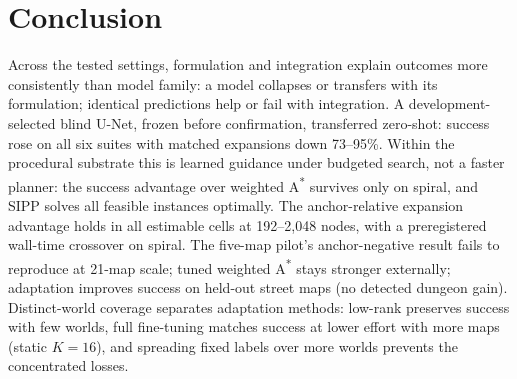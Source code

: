 \documentclass[letterpaper]{article} %
\begin{document}
\section{Conclusion}

 Across the tested settings, formulation and integration explain outcomes more consistently than model family: a model collapses or transfers with its formulation; identical predictions help or fail with integration. A development-selected blind U-Net, frozen before confirmation, transferred zero-shot: success rose on all six suites with matched expansions down 73--95\%.  Within the procedural substrate this is learned guidance under budgeted search, not a faster planner: the success advantage over weighted A\textsuperscript{*} survives only on spiral, and SIPP solves all feasible instances optimally. The anchor-relative expansion advantage holds in all estimable cells at 192--2{,}048 nodes, with a preregistered wall-time crossover on spiral. The five-map pilot's anchor-negative result fails to reproduce at 21-map scale; tuned weighted A\textsuperscript{*} stays stronger externally; adaptation improves success on held-out street maps (no detected dungeon gain). Distinct-world coverage separates adaptation methods: low-rank preserves success with few worlds, full fine-tuning matches success at lower effort with more maps (static $K{=}16$), and spreading fixed labels over more worlds prevents the concentrated losses.

\clearpage


\end{document}
